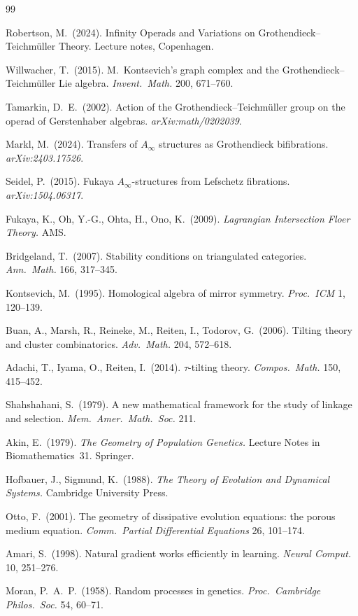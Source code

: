 \documentclass[11pt]{amsart}
\begin{document}
\begin{thebibliography}{99}

Robertson, M.\ (2024).
Infinity Operads and Variations on Grothendieck--Teichm{\"{u}}ller Theory.
Lecture notes, Copenhagen.

Willwacher, T.\ (2015).
M.\ Kontsevich's graph complex and the Grothendieck--Teichm{\"{u}}ller Lie algebra.
\emph{Invent.\ Math.} 200, 671--760.

Tamarkin, D.~E.\ (2002).
Action of the Grothendieck--Teichm{\"u}ller group on the operad of
Gerstenhaber algebras.
\emph{arXiv:math/0202039}.

Markl, M.\ (2024).
Transfers of $A_\infty$ structures as Grothendieck bifibrations.
\emph{arXiv:2403.17526}.

Seidel, P.\ (2015).
Fukaya $A_\infty$-structures from Lefschetz fibrations.
\emph{arXiv:1504.06317}.

Fukaya, K., Oh, Y.-G., Ohta, H., Ono, K.\ (2009).
\emph{Lagrangian Intersection Floer Theory.}
AMS.

Bridgeland, T.\ (2007).
Stability conditions on triangulated categories.
\emph{Ann.\ Math.} 166, 317--345.

Kontsevich, M.\ (1995).
Homological algebra of mirror symmetry.
\emph{Proc.\ ICM} 1, 120--139.

Buan, A., Marsh, R., Reineke, M., Reiten, I., Todorov, G.\ (2006).
Tilting theory and cluster combinatorics.
\emph{Adv.\ Math.} 204, 572--618.

Adachi, T., Iyama, O., Reiten, I.\ (2014).
$\tau$-tilting theory.
\emph{Compos.\ Math.} 150, 415--452.

Shahshahani, S.\ (1979).
A new mathematical framework for the study of linkage and selection.
\emph{Mem.\ Amer.\ Math.\ Soc.} 211.

Akin, E.\ (1979).
\emph{The Geometry of Population Genetics.}
Lecture Notes in Biomathematics~31. Springer.

Hofbauer, J., Sigmund, K.\ (1988).
\emph{The Theory of Evolution and Dynamical Systems.}
Cambridge University Press.

Otto, F.\ (2001).
The geometry of dissipative evolution equations: the porous medium equation.
\emph{Comm.\ Partial Differential Equations} 26, 101--174.

Amari, S.\ (1998).
Natural gradient works efficiently in learning.
\emph{Neural Comput.} 10, 251--276.

Moran, P.\ A.\ P.\ (1958).
Random processes in genetics.
\emph{Proc.\ Cambridge Philos.\ Soc.} 54, 60--71.

\end{thebibliography}
\end{document}

